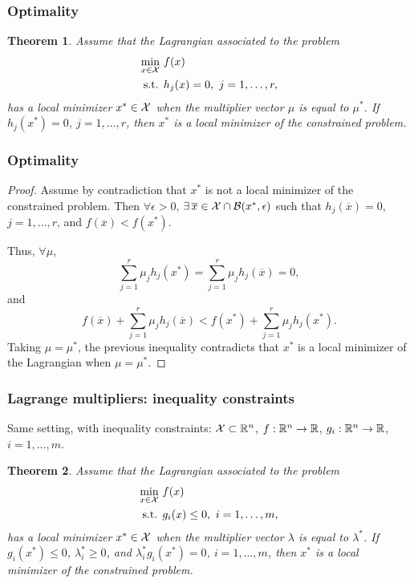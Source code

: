 \documentclass[usepdftitle=false,aspectratio=169]{beamer}
\newtheorem{thm}{Theorem}
\begin{document}
\begin{frame}
\frametitle{Optimality}

\begin{thm}
Assume that the Lagrangian associated to the problem
\begin{align*}
\min_{x \in {\mathcal{X}}} \ & f(x) \\
\mbox{s.t. } & h_j(x) = 0,\ j = 1,\ldots,r,
\end{align*}
has a local minimizer $x^* \in {\mathcal{X}}$ when the multiplier vector $\mu$ is equal to $\mu^*$.
If $h_j(x^*) = 0$, $j = 1,\ldots,r$, then $x^*$ is a local minimizer of the constrained problem.
\end{thm}

\end{frame}

\begin{frame}
\frametitle{Optimality}

\begin{proof}
Assume by contradiction that $x^*$ is not a local minimizer of the constrained problem.
Then $\forall \epsilon > 0$, $\exists\, \overline{x} \in {\mathcal{X}} \cap {\mathcal{B}}(x^*, \epsilon)$ such that $h_j(\overline{x}) = 0$, $j = 1,\ldots,r$, and $f(\overline{x}) < f(x^*)$.
	
Thus, $\forall \mu$,
	$$
	\sum_{j = 1}^{r} \mu_j h_j(x^*) = \sum_{j = 1}^{r} \mu_j h_j(\overline{x}) = 0,
	$$
and
$$
f(\overline{x}) + \sum_{j = 1}^{r} \mu_j h_j(\overline{x}) < f(x^*) + \sum_{j = 1}^{r} \mu_j h_j(x^*).
$$
Taking $\mu = \mu^*$, the previous inequality contradicts that $x^*$ is a local minimizer of the Lagrangian when $\mu = \mu^*$.
\end{proof}

\end{frame}

\begin{frame}
\frametitle{Lagrange multipliers: inequality constraints}

Same setting, with inequality constraints: ${\mathcal{X}} \subset {\mathbb{R}}^n$, $f: {\mathbb{R}}^n \rightarrow {\mathbb{R}}$, $g_i: {\mathbb{R}}^n \rightarrow {\mathbb{R}}$, $i = 1,\ldots,m$.

\mbox{}

\begin{thm}
Assume that the Lagrangian associated to the problem
\begin{align*}
\min_{x \in {\mathcal{X}}} \ & f(x) \\
\mbox{s.t. } & g_i(x) \leq 0,\ i = 1,\ldots,m,
\end{align*}
has a local minimizer $x^* \in {\mathcal{X}}$ when the multiplier vector $\lambda$ is equal to $\lambda^*$.
If $g_i(x^*) \leq 0$, $\lambda^*_i \geq 0$, and $\lambda^*_i g_i(x^*) = 0$, $i = 1,\ldots,m$, then $x^*$ is a local minimizer of the constrained problem.
\end{thm}

\end{frame}
\end{document}

